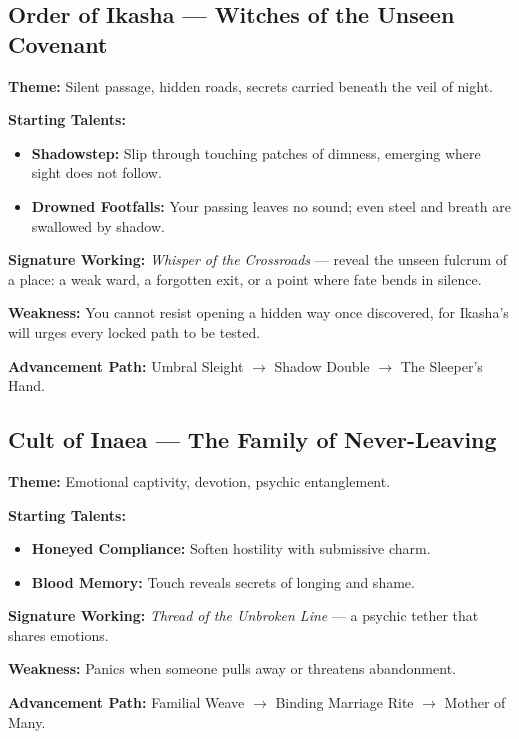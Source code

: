 \documentclass[11pt]{book}
\begin{document}
\subsection*{Order of Ikasha --- Witches of the Unseen Covenant}
\begin{tcolorbox}[colback=mistgray!10, colframe=shadowviolet, title={The Shadowbound Operative}]

\textbf{Theme:} Silent passage, hidden roads, secrets carried beneath the veil of night.

\textbf{Starting Talents:}
\begin{itemize}[noitemsep]
    \item \textbf{Shadowstep:} Slip through touching patches of dimness, emerging where sight does not follow.
    \item \textbf{Drowned Footfalls:} Your passing leaves no sound; even steel and breath are swallowed by shadow.
\end{itemize}

\textbf{Signature Working:} \emph{Whisper of the Crossroads} --- reveal the unseen fulcrum of a place: a weak ward, a forgotten exit, or a point where fate bends in silence.

\textbf{Weakness:} You cannot resist opening a hidden way once discovered, for Ikasha's will urges every locked path to be tested.

\textbf{Advancement Path:} Umbral Sleight $\rightarrow$ Shadow Double $\rightarrow$ The Sleeper's Hand.
\end{tcolorbox}

\subsection*{Cult of Inaea --- The Family of Never-Leaving}
\begin{tcolorbox}[colback=mistgray!10, colframe=shadowviolet, title={The Quiet Daughter}]
\textbf{Theme:} Emotional captivity, devotion, psychic entanglement.

\textbf{Starting Talents:}
\begin{itemize}[noitemsep]
    \item \textbf{Honeyed Compliance:} Soften hostility with submissive charm.
    \item \textbf{Blood Memory:} Touch reveals secrets of longing and shame.
\end{itemize}

\textbf{Signature Working:} \emph{Thread of the Unbroken Line} --- a psychic tether
that shares emotions.

\textbf{Weakness:} Panics when someone pulls away or threatens abandonment.

\textbf{Advancement Path:} Familial Weave $\rightarrow$ Binding Marriage Rite 
$\rightarrow$ Mother of Many.
\end{tcolorbox}
\end{document}
